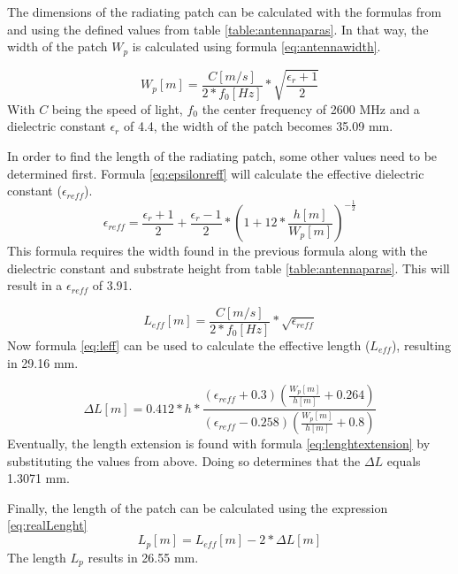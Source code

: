 The dimensions of the radiating patch can be calculated with the formulas from \cite{J14_antennadesign} and \cite{J15_antennadesign}
using the defined values from table \ref{table:antennaparas}. In that way, the width of the patch $W_{p}$ is calculated using formula \ref{eq:antennawidth}.

\begin{equation} 
W_{p} [m] = \frac{C [m/s]}{2*f_0 [Hz]}*\sqrt{\frac{\epsilon_r+1}{2}}
\label{eq:antennawidth}
\end{equation}
With $C$ being the speed of light, $f_0$ the center frequency of 2600 MHz and a dielectric constant $\epsilon_r$ of 4.4, the width of the patch becomes 35.09 mm.

In order to find the length of the radiating patch, some other values need to be determined first. Formula \ref{eq:epsilonreff} will
calculate the effective dielectric constant ($\epsilon_{reff}$).
\begin{equation} 
\epsilon_{reff} = \frac{\epsilon_r+1}{2}+  \frac{\epsilon_r-1}{2} * \left(1+12*\frac{h [m]}{W_{p} [m] }\right)^{-\frac{1}{2}}
\label{eq:epsilonreff}
\end{equation}
This formula requires the width found in the previous formula along with the dielectric constant and substrate height from table \ref{table:antennaparas}.
This will result in a $\epsilon_{reff}$ of 3.91.

\begin{equation} 
L_{eff} [m] = \frac{C [m/s]}{2*f_0 [Hz]}*\sqrt{\epsilon_{reff}}
\label{eq:leff}
\end{equation}
Now formula \ref{eq:leff} can be used to calculate the effective length ($L_{eff}$), resulting in 29.16 mm.

\begin{equation} 
\Delta L [m]= 0.412*h*\frac{(\epsilon_{reff}+0.3)\left(\frac{W_{p} [m]}{h [m]}+0.264\right)}{\left(\epsilon_{reff}-0.258\right)\left(\frac{W_{p} [m]}{h [m]}+0.8\right)}
\label{eq:lenghtextension}
\end{equation}
Eventually, the length extension is found with formula \ref{eq:lenghtextension} by substituting the values from above.
Doing so determines that the $\Delta L$ equals 1.3071 mm.

Finally, the length of the patch can be calculated using the expression \ref{eq:realLenght}
\begin{equation} 
L_p [m]= L_{eff} [m] - 2 * \Delta L [m]
\label{eq:realLenght}
\end{equation}
The length $L_p$ results in 26.55 mm.

